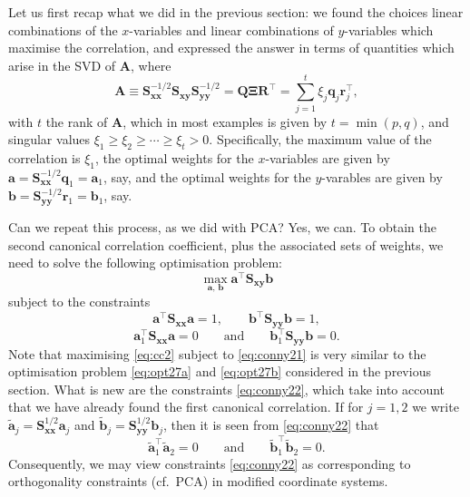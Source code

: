 \documentclass[]{book}
\theoremstyle{definition}
\theoremstyle{definition}
\theoremstyle{definition}
\theoremstyle{remark}
\begin{document}
Let us first recap what we did in the previous section: we found the choices linear combinations of the \(x\)-variables and linear combinations of \(y\)-variables which
maximise the correlation, and expressed the answer in terms of quantities which arise in the SVD of \(\boldsymbol A\), where
\[
\boldsymbol A\equiv \boldsymbol S_{\boldsymbol x\boldsymbol x}^{-1/2} \boldsymbol S_{\boldsymbol x\boldsymbol y}\boldsymbol S_{\boldsymbol y\boldsymbol y}^{-1/2}=\boldsymbol Q{\pmb \Xi} \boldsymbol R^\top=\sum_{j=1}^t \xi_j \boldsymbol q_j \boldsymbol r_j^\top,
\]
with \(t\) the rank of \(\boldsymbol A\), which in most examples is given by \(t=\min(p,q)\), and singular values \(\xi_1 \geq \xi_2 \geq \cdots \geq \xi_t>0\).
Specifically, the maximum value of the correlation is \(\xi_1\), the optimal weights for the \(x\)-variables are given by \(\boldsymbol a=\boldsymbol S_{\boldsymbol x\boldsymbol x}^{-1/2}\boldsymbol q_1=\boldsymbol a_1\), say, and
the optimal weights for the \(y\)-varables are given by \(\boldsymbol b=\boldsymbol S_{\boldsymbol y\boldsymbol y}^{-1/2}\boldsymbol r_1 = \boldsymbol b_1\), say.

Can we repeat this process, as we did with PCA? Yes, we can. To obtain the second canonical correlation coefficient, plus the associated sets of weights, we need to solve the following optimisation problem:
\begin{equation}
\max_{\boldsymbol a,\, \boldsymbol b} \boldsymbol a^\top \boldsymbol S_{\boldsymbol x\boldsymbol y}\boldsymbol b
\label{eq:cc2}
\end{equation}
subject to the constraints
\begin{equation}
\boldsymbol a^\top \boldsymbol S_{\boldsymbol x\boldsymbol x}\boldsymbol a= 1, \qquad \boldsymbol b^\top \boldsymbol S_{\boldsymbol y\boldsymbol y}\boldsymbol b=1,
\label{eq:conny21}
\end{equation}
\begin{equation}
\boldsymbol a_1^\top \boldsymbol S_{\boldsymbol x\boldsymbol x} \boldsymbol a=0 \qquad \text{and} \qquad \boldsymbol b_1^\top \boldsymbol S_{\boldsymbol y\boldsymbol y}\boldsymbol b=0.
\label{eq:conny22}
\end{equation}
Note that maximising \eqref{eq:cc2} subject to \eqref{eq:conny21} is very similar to the optimisation problem \eqref{eq:opt27a} and \eqref{eq:opt27b} considered in the previous section. What is
new are the constraints \eqref{eq:conny22}, which take into account that we have already found the first canonical correlation. If for \(j=1,2\) we write \(\tilde{\boldsymbol a}_j =\boldsymbol S_{\boldsymbol x\boldsymbol x}^{1/2} \boldsymbol a_j\) and \(\tilde{\boldsymbol b}_j=\boldsymbol S_{\boldsymbol y\boldsymbol y}^{1/2} \boldsymbol b_j\), then it is seen from \eqref{eq:conny22} that
\[
\tilde{\boldsymbol a}_1^\top \tilde{\boldsymbol a}_2=0 \qquad \text{and} \qquad \tilde{\boldsymbol b}_1^\top \tilde{\boldsymbol b}_2=0.
\]
Consequently, we may view constraints \eqref{eq:conny22} as corresponding to orthogonality constraints (cf.~PCA) in modified coordinate systems.
\end{document}
